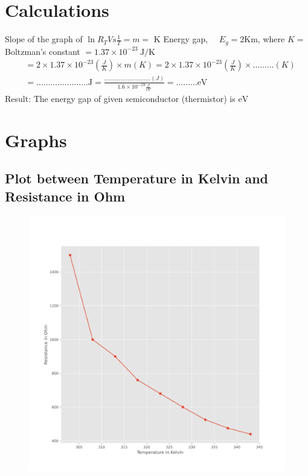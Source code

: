 \documentclass[12pt]{article}
\begin{document}
\section{Calculations}
Slope of the graph of $\ln R_{T} V s \frac{1}{T}=m=$ $\mathrm{K}$
Energy gap, $\quad E_{g}=2 \mathrm{Km}$, where $K=$ Boltzman's constant $=1.37 \times 10^{-23} \mathrm{~J} / \mathrm{K}$
$$
\begin{aligned}
&=2 \times 1.37 \times 10^{-23}\left(\frac{J}{K}\right) \times m(K)=2 \times 1.37 \times 10^{-23}\left(\frac{J}{K}\right) \times \ldots \ldots \ldots(K) \\
&=\ldots \ldots \ldots \ldots \ldots \ldots \ldots . \mathrm{J}=\frac{. \ldots \ldots \ldots \ldots \ldots \ldots \ldots \ldots \ldots(J)}{1.6 \times 10^{-19} \frac{J}{e V}}=\ldots \ldots \ldots \mathrm{eV}
\end{aligned}
$$
Result: The energy gap of given semiconductor (thermistor) is $\mathrm{eV}$
	
\section{Graphs}
\subsection{Plot between Temperature in Kelvin and Resistance in Ohm}
\begin{figure}[H]
	\centering
	\includegraphics[scale=0.6]{fig.png}
	\label{it}
\end{figure}
\end{document}
